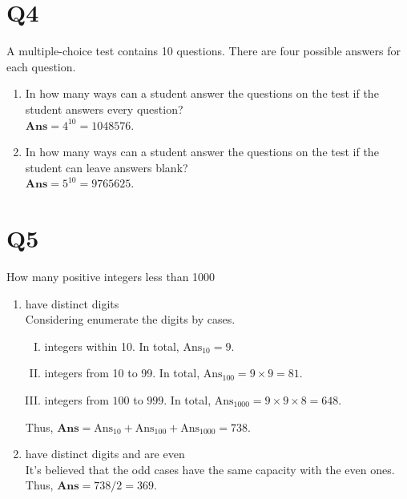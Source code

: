 \documentclass[11pt]{article}
\newenvironment{qparts}{\begin{enumerate}[{(}a{)}]}{\end{enumerate}}
\begin{document}
\section*{Q4}
A multiple-choice test contains 10 questions. There are four
possible answers for each question.
\begin{qparts}
    
    \item In how many ways can a student answer the questions on the test if the student answers every question?\\
    $\textbf{Ans}=4^{10}=1048576$.

    \item In how many ways can a student answer the questions on the test if the student can leave answers blank?\\
    $\textbf{Ans}=5^{10}=9765625$.


\end{qparts}

\section*{Q5}
How many positive integers less than 1000
\begin{qparts}
    
    \item have distinct digits\\
    Considering enumerate the digits by cases.
    \begin{enumerate}[I. ]
        \item integers within 10. In total, $\text{Ans}_{10}=9$.
        \item integers from 10 to 99. In total, $\text{Ans}_{100}=9\times 9=81$.
        \item integers from $100$ to $999$. In total, $\text{Ans}_{1000}=
        9\times 9\times 8=648$.
    \end{enumerate}
    Thus, $\textbf{Ans}=\text{Ans}_{10}+\text{Ans}_{100}+\text{Ans}_{1000}=738$.

    \item have distinct digits and are even\\
    It's believed that the odd cases have the same capacity with the even ones. Thus, $\textbf{Ans}=738 / 2=369$.
\end{qparts}
\end{document}
